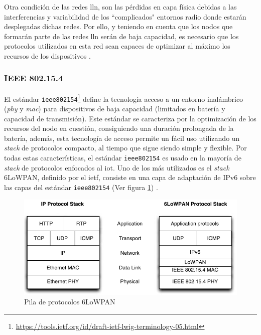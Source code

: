 \par
Otra condición de las redes \gls{lln}, son las pérdidas en capa física debidas a las interferencias y variabilidad de los ``complicados" entornos radio donde estarán desplegadas dichas redes. Por ello, y teniendo en cuenta que los nodos que formarán parte de las redes \gls{lln} serán de baja capacidad, es necesario que los protocolos utilizados en esta red sean capaces de optimizar al máximo los recursos de los dispositivos \cite{iotbook}. 

\subsubsection{IEEE 802.15.4}

El estándar \texttt{ieee802154}\footnote{\url{https://tools.ietf.org/id/draft-ietf-lwig-terminology-05.html}} define la tecnología acceso a un entorno inalámbrico (\textit{phy} y \textit{mac}) para dispositivos de baja capacidad (limitados en batería y capacidad de transmisión). Este estándar se caracteriza por la optimización de los recursos del nodo en cuestión, consiguiendo una duración prolongada de la batería, además, esta tecnología de acceso permite un fácil uso utilizando un \textit{stack} de protocolos compacto, al tiempo que sigue siendo simple y flexible. Por todas estas características, el estándar \texttt{ieee802154} es usado en la mayoría de \textit{stack} de protocolos enfocados al \gls{iot}. Uno de los más utilizados es el \textit{stack} 6LoWPAN, definido por el \gls{ietf}, consiste en una capa de adaptación de IPv6 sobre las capas del estándar \texttt{ieee802154} (Ver figura \ref{fig:6lowapan}) \cite{6lowpan}.\\
\par

\vspace{0.5cm}

\begin{figure}[ht]
    \centering
    \includegraphics[width=12cm]{archivos/img/teoria/6LoWPAN-Protocol-Stack.png}
    \caption{Pila de protocolos 6LoWPAN \cite{6lowpan}}
    \label{fig:6lowapan}
\end{figure}

